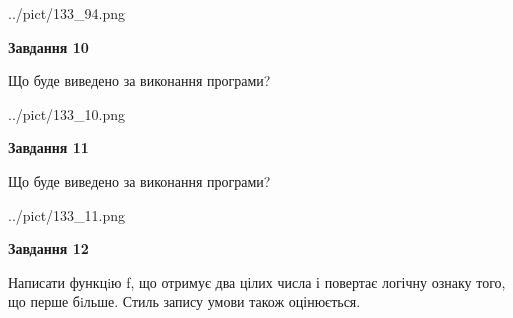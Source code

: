 \documentclass[12pt, ukrainian]{article}
\begin{document}
{\begin {large}
\begin{center}
	{../pict/133_94.png}
\end{center}
\newpage

{\begin {center}\textbf{Завдання 10}\end {center}}

Що буде виведено за виконання програми?\par
\begin{center}
	{../pict/133_10.png}
\end{center}
\newpage

{\begin {center}\textbf{Завдання 11}\end {center}}

Що буде виведено за виконання програми?\par
\begin{center}
	{../pict/133_11.png}
\end{center}
\newpage

{\begin {center}\textbf{Завдання 12}\end {center}}


Написати функцiю f, що отримує два цілих числа і повертає логічну ознаку того, що перше бiльше. Стиль запису умови також оцінюється.\par
\newpage

\end {large}}
\end{document}
